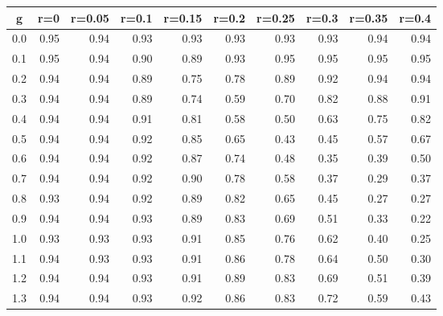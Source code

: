 %
\begin{table}[!tbp]
 \begin{center}
 \begin{tabular}{rrrrrrrrrr}\hline\hline
\multicolumn{1}{c}{g}&\multicolumn{1}{c}{r=0}&\multicolumn{1}{c}{r=0.05}&\multicolumn{1}{c}{r=0.1}&\multicolumn{1}{c}{r=0.15}&\multicolumn{1}{c}{r=0.2}&\multicolumn{1}{c}{r=0.25}&\multicolumn{1}{c}{r=0.3}&\multicolumn{1}{c}{r=0.35}&\multicolumn{1}{c}{r=0.4}\tabularnewline
\hline
0.0&0.95&0.94&0.93&0.93&0.93&0.93&0.93&0.94&0.94\tabularnewline
0.1&0.95&0.94&0.90&0.89&0.93&0.95&0.95&0.95&0.95\tabularnewline
0.2&0.94&0.94&0.89&0.75&0.78&0.89&0.92&0.94&0.94\tabularnewline
0.3&0.94&0.94&0.89&0.74&0.59&0.70&0.82&0.88&0.91\tabularnewline
0.4&0.94&0.94&0.91&0.81&0.58&0.50&0.63&0.75&0.82\tabularnewline
0.5&0.94&0.94&0.92&0.85&0.65&0.43&0.45&0.57&0.67\tabularnewline
0.6&0.94&0.94&0.92&0.87&0.74&0.48&0.35&0.39&0.50\tabularnewline
0.7&0.94&0.94&0.92&0.90&0.78&0.58&0.37&0.29&0.37\tabularnewline
0.8&0.93&0.94&0.92&0.89&0.82&0.65&0.45&0.27&0.27\tabularnewline
0.9&0.94&0.94&0.93&0.89&0.83&0.69&0.51&0.33&0.22\tabularnewline
1.0&0.93&0.93&0.93&0.91&0.85&0.76&0.62&0.40&0.25\tabularnewline
1.1&0.94&0.93&0.93&0.91&0.86&0.78&0.64&0.50&0.30\tabularnewline
1.2&0.94&0.94&0.93&0.91&0.89&0.83&0.69&0.51&0.39\tabularnewline
1.3&0.94&0.94&0.93&0.92&0.86&0.83&0.72&0.59&0.43\tabularnewline
\hline
\end{tabular}

\end{center}

\end{table}


